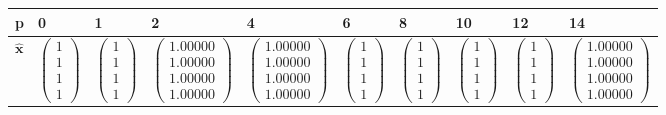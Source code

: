 \documentclass[12pt]{article}
\def\MM#1{\boldsymbol{#1}}
\begin{document}
\begin{center}
	\scriptsize
	\begin{tabular}{| l | l | l | l | l | l | l | l | l | l |}
		\hline
		p & 0 & 1 & 2 & 4 & 6 & 8 & 10 & 12 & 14 \\ \hline
		$\hat{\MM{x}}$ 
		& $\begin{pmatrix}1\\1\\1\\1\end{pmatrix}$
		& $\begin{pmatrix}1\\1\\1\\1\end{pmatrix}$ 
		& $\begin{pmatrix}1.00000\\1.00000\\1.00000\\1.00000\end{pmatrix}$  
		& $\begin{pmatrix}1.00000\\1.00000\\1.00000\\1.00000\end{pmatrix}$
		& $\begin{pmatrix}1\\1\\1\\1\end{pmatrix}$
		& $\begin{pmatrix}1\\1\\1\\1\end{pmatrix}$ 
		& $\begin{pmatrix}1\\1\\1\\1\end{pmatrix}$ 
		& $\begin{pmatrix}1\\1\\1\\1\end{pmatrix}$ 
		& $\begin{pmatrix}1.00000\\1.00000\\1.00000\\1.00000\end{pmatrix}$ \\ \hline
	\end{tabular}
\end{center}
\end{document}
